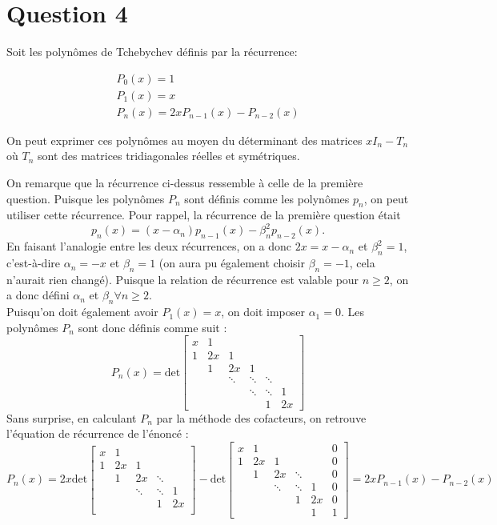 \section*{Question 4}
Soit les polynômes de Tchebychev définis par la récurrence: 


\begin{eqnarray}
P_0(x)=1\\
P_1(x)=x\\
P_n(x)=2xP_{n-1}(x)-P_{n-2}(x)
\end{eqnarray}


On peut exprimer ces polynômes au moyen du déterminant des matrices $xI_n - T_n$ où $T_n$ sont des matrices tridiagonales réelles et symétriques.

On remarque que la récurrence ci-dessus ressemble à celle de la première question. Puisque les polynômes $P_n$ sont définis comme les polynômes $p_n$, on peut utiliser cette récurrence. Pour rappel, la récurrence de la première question était $$p_n(x) = (x-\alpha_n)p_{n-1}(x) - \beta_n^2 p_{n-2}(x).$$
En faisant l'analogie entre les deux récurrences, on a donc $2x = x - \alpha_n$ et $\beta_n^2 = 1$, c'est-à-dire $\alpha_n = -x$ et $\beta_n = 1$ (on aura pu également choisir $\beta_n = -1$, cela n'aurait rien changé). Puisque la relation de récurrence est valable pour $n \geq 2$, on a donc défini $\alpha_n$ et $\beta_n \forall n \geq 2$.\\ Puisqu'on doit également avoir $P_1(x) = x$, on doit imposer $\alpha_1 = 0$. Les polynômes $P_n$ sont donc définis comme suit :
$$P_n(x) = \text{det}
\left[ 
\begin{array}{cccccc}
x & 1 & & & &  \\
1 & 2x & 1 & & & \\
 & 1 & 2x & 1 & & \\
 & & \ddots & \ddots & \ddots & \\
 & & & \ddots & \ddots &  1\\
 & & & &  1 & 2x
\end{array}
\right] 
$$
Sans surprise, en calculant $P_n$ par la méthode des cofacteurs, on retrouve l'équation de récurrence de l'énoncé : 
$$P_n(x) = 2x \text{det}
\left[ 
\begin{array}{ccccc}
x & 1 & & &  \\
1 & 2x & 1 & & \\
 & 1 & 2x & \ddots & \\
 & & \ddots & \ddots & 1  \\
 & & & 1 & 2x   \\
\end{array}
\right] - \text{det}
\left[ 
\begin{array}{cccccc}
x & 1 & & & & 0 \\
1 & 2x & 1 & & & 0\\
 & 1 & 2x & \ddots & & 0\\
 & & \ddots & \ddots & 1 & 0\\
 & & & 1 & 2x &  0\\
 & & & &  1 &  1
\end{array}
\right] = 2xP_{n-1}(x)-P_{n-2}(x)$$

